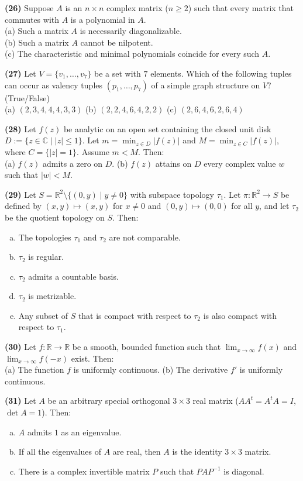 \documentclass[11pt,a4paper]{article}
\newcommand{\R}{\mathbb{R}}
\newcommand{\C}{\mathbb{C}}
\newcommand{\qitem}[1]{\par\medskip\noindent\textbf{#1}\hspace{0.5em}}
\begin{document}
\qitem{(26)} Suppose $A$ is an $n \times n$ complex matrix ($n \ge 2$) such that every matrix that commutes with $A$ is a polynomial in $A$.\\
(a) Such a matrix $A$ is necessarily diagonalizable.\\
(b) Such a matrix $A$ cannot be nilpotent.\\
(c) The characteristic and minimal polynomials coincide for every such $A$.

\qitem{(27)} Let $V = \{v_1, \dots, v_7\}$ be a set with $7$ elements. Which of the following tuples can occur as valency tuples $(p_1, \dots, p_7)$ of a simple graph structure on $V$? (True/False)\\
(a) $(2, 3, 4, 4, 4, 3, 3)$ \qquad (b) $(2, 2, 4, 6, 4, 2, 2)$ \qquad (c) $(2, 6, 4, 6, 2, 6, 4)$

\qitem{(28)} Let $f(z)$ be analytic on an open set containing the closed unit disk $D := \{z \in \C \mid |z| \le 1\}$. Let $m = \min_{z \in D} |f(z)|$ and $M = \min_{z \in C} |f(z)|$, where $C = \{|z| = 1\}$. Assume $m < M$. Then:\\
(a) $f(z)$ admits a zero on $D$. \qquad (b) $f(z)$ attains on $D$ every complex value $w$ such that $|w| < M$.

\qitem{(29)} Let $S = \R^2 \setminus \{(0, y) \mid y \neq 0\}$ with subspace topology $\tau_1$. Let $\pi : \R^2 \to S$ be defined by $(x, y) \mapsto (x, y)$ for $x \neq 0$ and $(0, y) \mapsto (0, 0)$ for all $y$, and let $\tau_2$ be the quotient topology on $S$. Then:
\begin{enumerate}[(a)]
  \item The topologies $\tau_1$ and $\tau_2$ are not comparable.
  \item $\tau_2$ is regular.
  \item $\tau_2$ admits a countable basis.
  \item $\tau_2$ is metrizable.
  \item Any subset of $S$ that is compact with respect to $\tau_2$ is also compact with respect to $\tau_1$.
\end{enumerate}

\qitem{(30)} Let $f : \R \to \R$ be a smooth, bounded function such that $\lim_{x \to \infty} f(x)$ and $\lim_{x \to \infty} f(-x)$ exist. Then:\\
(a) The function $f$ is uniformly continuous. \qquad (b) The derivative $f'$ is uniformly continuous.

\qitem{(31)} Let $A$ be an arbitrary special orthogonal $3 \times 3$ real matrix ($AA^t = A^t A = I$, $\det A = 1$). Then:
\begin{enumerate}[(a)]
  \item $A$ admits $1$ as an eigenvalue.
  \item If all the eigenvalues of $A$ are real, then $A$ is the identity $3 \times 3$ matrix.
  \item There is a complex invertible matrix $P$ such that $PAP^{-1}$ is diagonal.
\end{enumerate}
\end{document}
